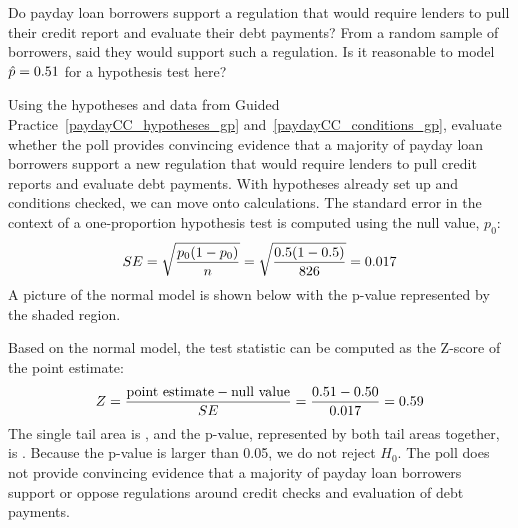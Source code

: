 \D{\newpage}

\begin{exercisewrap}
\begin{nexercise}
\label{paydayCC_conditions_gp}%
Do payday loan borrowers support a regulation
that would
require lenders to pull their credit report
and evaluate their debt payments?
From a random sample of \paydayN{} borrowers,
\paydayCCPerc{} said they would support such
a regulation.
Is it reasonable to model $\hat{p} = 0.51{}$
for a hypothesis test here?\footnotemark
\end{nexercise}
\end{exercisewrap}
    
\begin{examplewrap}
\begin{nexample}{Using the hypotheses and data from
    Guided Practice~\ref{paydayCC_hypotheses_gp}
    and~\ref{paydayCC_conditions_gp},
    evaluate whether the poll provides convincing evidence
    that a majority of payday loan borrowers support
    a new regulation that would
    require lenders to pull credit reports
    and evaluate debt payments.}
  With hypotheses already set up and conditions checked,
  we can move onto calculations.
  The standard error in the context of a one-proportion
  hypothesis test is computed using the null value, $p_0$:
  \begin{align*}
  SE = \sqrt{\frac{p_0 (1 - p_0)}{n}}
      = \sqrt{\frac{0.5 (1 - 0.5)}{826{}}}
      = 0.017{}
  \end{align*}
  A picture of the normal model is shown below
  with the p-value represented by the shaded region.
  \begin{center}
  \end{center}
  Based on the normal model, the test statistic can be
  computed as the Z-score of the point estimate:
  \begin{align*}
  Z = \frac{\text{point estimate} - \text{null value}}{SE}
      = \frac{0.51{} - 0.50}{0.017{}}
      = 0.59{}
  \end{align*}
  The single tail area is \paydayCCOneTail{}, and the p-value,
  represented by both tail areas together, is \paydayCCPvalue{}.
  Because the p-value is larger than 0.05,
  we do not reject $H_0$.
  The poll does not provide convincing evidence that
  a majority of payday loan borrowers support or oppose
  regulations around credit checks and evaluation of
  debt payments.
\end{nexample}
\end{examplewrap}

